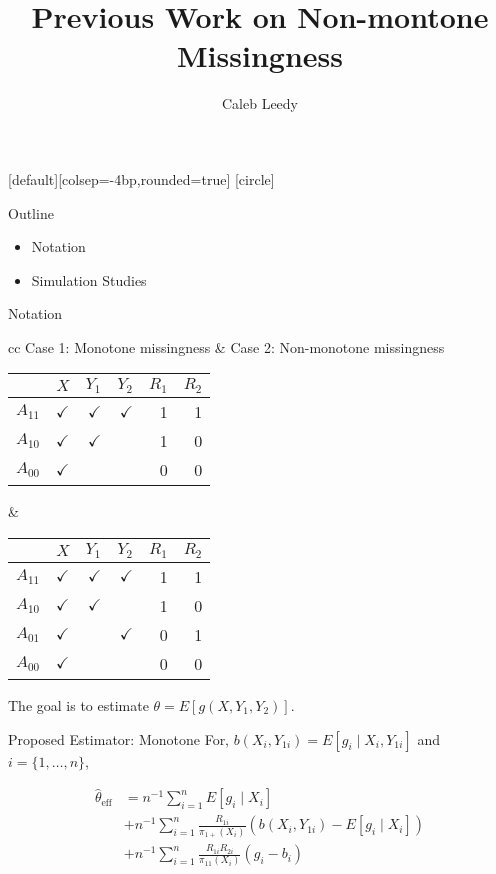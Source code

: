 \documentclass{beamer} %
\author{Caleb Leedy}
\title[Data Integration]{Previous Work on Non-montone Missingness}
\begin{document}
\everymath{\displaystyle}
[default][colsep=-4bp,rounded=true]
[circle]
\frame{\titlepage}

\begin{frame}{Outline}

  \begin{itemize}
    \item Notation
    \item Simulation Studies
  \end{itemize}
\end{frame}

\begin{frame}{Notation}

  \begin{tabular}{cc}
    Case 1: Monotone missingness &
  Case 2: Non-monotone missingness \\
  \begin{tabular}{lrrrrr}
    \toprule
    & $X$ & $Y_1$ & $Y_2$ & $R_1$ & $R_2$ \\
    \midrule
    $A_{11}$ & $\checkmark$ & $\checkmark$ & $\checkmark$ & 1 & 1 \\
    $A_{10}$ & $\checkmark$ & $\checkmark$ &          & 1 & 0 \\
    $A_{00}$ & $\checkmark$ &          &          & 0 & 0 \\
    \bottomrule
  \end{tabular} &
  \begin{tabular}{lrrrrr}
    \toprule
    & $X$ & $Y_1$ & $Y_2$ & $R_1$ & $R_2$ \\
    \midrule
    $A_{11}$ & $\checkmark$ & $\checkmark$ & $\checkmark$ & 1 & 1 \\
    $A_{10}$ & $\checkmark$ & $\checkmark$ &          & 1 & 0 \\
    $A_{01}$ & $\checkmark$ &          & $\checkmark$ & 0 & 1 \\
    $A_{00}$ & $\checkmark$ &          &          & 0 & 0 \\
    \bottomrule
  \end{tabular}
  \end{tabular}

  The goal is to estimate $\theta = E[g(X, Y_1, Y_2)]$.

\end{frame}

\begin{frame}{Proposed Estimator: Monotone}
  For, $b(X_i, Y_{1i}) = E[g_i \mid X_i, Y_{1i}]$ and $i = \{1, \dots, n\}$,

  \begin{align*}
\hat \theta_{\text{eff}} &= n^{-1} \sum_{i = 1}^n E[g_i \mid X_i] \\ 
&+ n^{-1} \sum_{i = 1}^n \frac{R_{1i}}{\pi_{1+}(X_i)}(b(X_i, Y_{1i}) - E[g_i \mid X_i]) \\ 
&+ n^{-1} \sum_{i = 1}^n \frac{R_{1i} R_{2i}}{\pi_{11}(X_i)}(g_i - b_i)
  \end{align*}
  
\end{frame}
\end{document}
